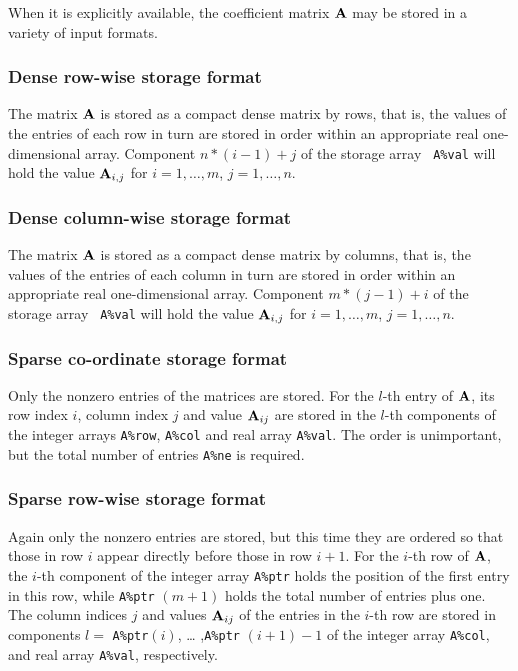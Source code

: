 \documentclass{galahad}
\begin{document}

\galmatrix
When it is explicitly available,
the coefficient matrix ${\mathbf{A}}$ may be stored in a variety of input formats.

\subsubsection{Dense row-wise storage format}\label{dense-row}
The matrix ${\mathbf{A}}$ is stored as a compact dense matrix by rows,
that is, the values of the entries of each row in turn are
stored in order within an appropriate real one-dimensional array.
Component $n \ast (i-1) + j$ of the storage array {\tt
  A\%val} will hold the value ${\mathbf{A}}_{i,j}$ for $i = 1, \ldots , m$, $j =
1, \ldots , n$.

\subsubsection{Dense column-wise storage format}\label{dense-column}
The matrix ${\mathbf{A}}$ is stored as a compact
dense matrix by columns, that is, the values of the entries of each column
in turn are stored in order within an appropriate real one-dimensional array.
Component $m \ast (j-1) + i$ of the storage array {\tt
  A\%val} will hold the value ${\mathbf{A}}_{i,j}$ for $i = 1, \ldots , m$, $j =
1, \ldots , n$.

\subsubsection{Sparse co-ordinate storage format}\label{coordinate}
Only the nonzero entries of the matrices are stored. For the $l$-th
entry of ${\mathbf{A}}$, its row index $i$, column index $j$ and value
${\mathbf{A}}_{ij}$ are stored in the $l$-th components of the integer arrays
{\tt A\%row}, {\tt A\%col} and real array {\tt A\%val}.
The order is unimportant, but the total number of entries {\tt A\%ne} is
required.

\subsubsection{Sparse row-wise storage format}\label{rowwise}
Again only the nonzero entries are stored, but this time they are
ordered so that those in row $i$ appear directly before those in row
$i+1$. For the $i$-th row of ${\mathbf{A}}$, the $i$-th component of the integer
array {\tt A\%ptr} holds the position of the first entry in this row,
while {\tt A\%ptr} $(m+1)$ holds the total number of entries plus one.
The column indices $j$ and values ${\mathbf{A}}_{ij}$ of the entries in the
$i$-th row are stored in components $l =$ {\tt A\%ptr}$(i)$, \ldots
,{\tt A\%ptr} $(i+1)-1$ of the integer array {\tt A\%col}, and real
array {\tt A\%val}, respectively.
\end{document}
